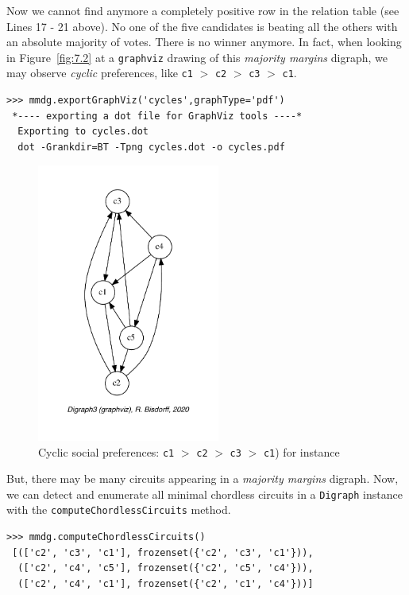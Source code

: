 Now we cannot find anymore a completely positive row in the relation table (see Lines 17 - 21 above). No one of the five candidates is beating all the others with an absolute majority of votes. There is no \Condorcet winner anymore. In fact, when looking in Figure~\vref{fig:7.2} at a \texttt{graphviz} drawing of this \emph{majority margins} digraph, we may observe \emph{cyclic} preferences, like \texttt{c1} $>$ \texttt{c2} $>$ \texttt{c3} $>$ \texttt{c1}.
\begin{lstlisting}
>>> mmdg.exportGraphViz('cycles',graphType='pdf')
 *---- exporting a dot file for GraphViz tools ----*
  Exporting to cycles.dot
  dot -Grankdir=BT -Tpng cycles.dot -o cycles.pdf
\end{lstlisting}
\begin{figure}[ht]
\sidecaption[t]
\includegraphics[width=6cm]{Figures/7-2-cycles.pdf}
\caption{Cyclic social preferences: \texttt{c1} $>$ \texttt{c2} $>$ \texttt{c3} $>$ \texttt{c1}) for instance}
\label{fig:7.2}       %
\end{figure}
	   
But, there may be many circuits appearing in a \emph{majority margins} digraph. Now, we can detect and enumerate all minimal chordless circuits in a \texttt{Digraph} instance with the \texttt{computeChordlessCircuits} method.
\begin{lstlisting}
>>> mmdg.computeChordlessCircuits()
 [(['c2', 'c3', 'c1'], frozenset({'c2', 'c3', 'c1'})), 
  (['c2', 'c4', 'c5'], frozenset({'c2', 'c5', 'c4'})), 
  (['c2', 'c4', 'c1'], frozenset({'c2', 'c1', 'c4'}))]
\end{lstlisting}

